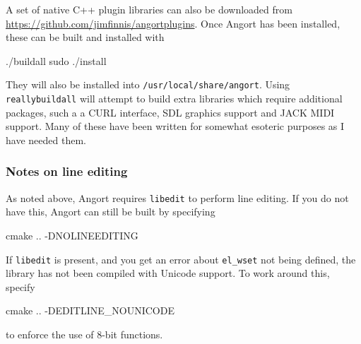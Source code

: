 A set
of native C++ plugin libraries can also be downloaded from
\url{https://github.com/jimfinnis/angortplugins}. Once Angort has
been installed, these can be built and installed with
\begin{v}
./buildall
sudo ./install
\end{v}
They will also be installed into \texttt{/usr/local/share/angort}.
Using \texttt{reallybuildall} will attempt to build extra libraries
which require additional packages, such a a CURL interface, SDL
graphics support and JACK MIDI support. Many of these have been written for
somewhat esoteric purposes as I have needed them.


\subsubsection{Notes on line editing}
As noted above, Angort requires \texttt{libedit} to perform
line editing. If you do not have this, Angort can still be built
by specifying
\begin{v}
cmake .. -DNOLINEEDITING
\end{v}
If \texttt{libedit} is present, and you get an error about \texttt{el_wset} not
being defined, the library has not been compiled with Unicode support.
To work around this, specify
\begin{v}
cmake .. -DEDITLINE_NOUNICODE
\end{v}
to enforce the use of 8-bit functions.
